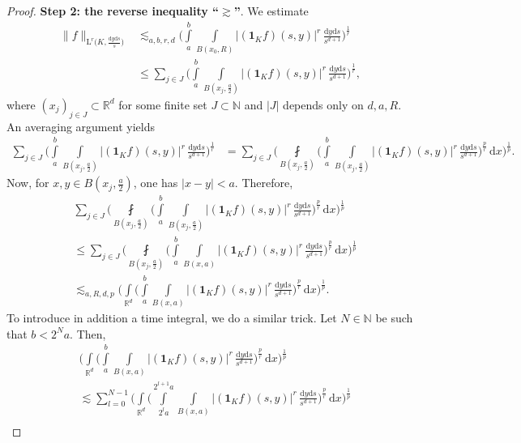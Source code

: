 \documentclass[11pt, leqno,parskip=half]{amsart}
\theoremstyle{definition}
\newcommand{\IR}{\mathbb{R}}
\newcommand{\IN}{\mathbb{N}}
\renewcommand{\L}{\mathrm{L}}
\renewcommand{\d}{\mathrm{d}}
\numberwithin{equation}{section}
\begin{document}
\begin{proof}
    \noindent \textbf{Step 2: the reverse inequality \enquote{$\gtrsim$}}. We estimate
    \begin{align*}
        \|f\|_{\L^r\big(K,\frac{\d y \d s}{s}\big)} &\lesssim_{a,b,r,d} \bigg(\int\limits_{a}^{b} \int\limits_{B(x_0,R)} |(\mathbf{1}_Kf)(s,y)|^r \,\frac{\d y \d s}{s^{d+1}}\bigg)^\frac{1}{r}\\
        &\leq \sum\limits_{j\in J}\bigg(\int\limits_{a}^{b} \int\limits_{B(x_j,\frac{a}{2})} |(\mathbf{1}_Kf)(s,y)|^r \,\frac{\d y \d s}{s^{d+1}}\bigg)^\frac{1}{r},
    \end{align*}
    where $(x_j)_{j\in J}\subset \IR^d$ for some finite set $J\subset \IN$ and $|J|$ depends only on $d,a,R$. An averaging argument yields
    \begin{align*}
        \sum\limits_{j\in J}\bigg(\int\limits_{a}^{b} \int\limits_{B(x_j,\frac{a}{2})} |(\mathbf{1}_Kf)(s,y)|^r \,\frac{\d y \d s}{s^{d+1}}\bigg)^\frac{1}{r}
        &= \sum\limits_{j\in J}\bigg(\fint\limits_{B(x_j,\frac{a}{2})}\bigg(\int\limits_{a}^{b} \int\limits_{B(x_j,\frac{a}{2})} |(\mathbf{1}_Kf)(s,y)|^r \,\frac{\d y \d s}{s^{d+1}}\bigg)^\frac{p}{r}\,\d x\bigg)^\frac{1}{p}.
    \end{align*}
    Now, for $x,y\in B(x_j,\frac{a}{2})$, one has $|x-y|<a$. Therefore,
    \begin{align*}
        &\sum\limits_{j\in J}\bigg(\fint\limits_{B(x_j,\frac{a}{2})}\bigg(\int\limits_{a}^{b} \int\limits_{B(x_j,\frac{a}{2})} |(\mathbf{1}_Kf)(s,y)|^r \,\frac{\d y \d s}{s^{d+1}}\bigg)^\frac{p}{r}\,\d x\bigg)^\frac{1}{p}\\
        &\leq \sum\limits_{j\in J}\bigg(\fint\limits_{B(x_j,\frac{a}{2})}\bigg(\int\limits_{a}^{b} \int\limits_{B(x,a)} |(\mathbf{1}_Kf)(s,y)|^r \,\frac{\d y \d s}{s^{d+1}}\bigg)^\frac{p}{r}\,\d x\bigg)^\frac{1}{p}\\
        &\lesssim_{a,R,d,p} \bigg(\int\limits_{\IR^d}\bigg(\int\limits_{a}^{b} \int\limits_{B(x,a)} |(\mathbf{1}_Kf)(s,y)|^r \,\frac{\d y \d s}{s^{d+1}}\bigg)^\frac{p}{r}\,\d x\bigg)^\frac{1}{p}.
    \end{align*}
    To introduce in addition a time integral, we do a similar trick. Let $N\in\IN$ be such that $b<2^Na$. Then,
    \begin{align*}
        &\bigg(\int\limits_{\IR^d}\bigg(\int\limits_{a}^{b} \int\limits_{B(x,a)} |(\mathbf{1}_Kf)(s,y)|^r \,\frac{\d y \d s}{s^{d+1}}\bigg)^\frac{p}{r}\,\d x\bigg)^\frac{1}{p}\\
        &\lesssim\sum\limits_{l=0}^{N-1} \bigg(\int\limits_{\IR^d}\bigg(\int\limits_{2^la}^{2^{l+1}a} \int\limits_{B(x,a)} |(\mathbf{1}_Kf)(s,y)|^r \,\frac{\d y \d s}{s^{d+1}}\bigg)^\frac{p}{r}\,\d x\bigg)^\frac{1}{p}\\

\end{align*}
\end{proof}
\end{document}

